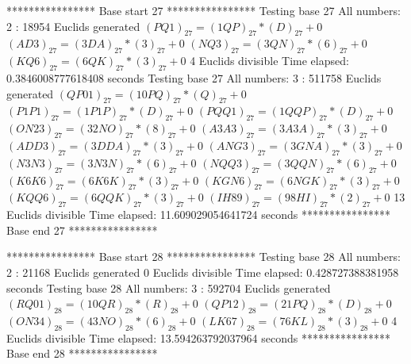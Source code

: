 **************** Base start 27 ****************
Testing base 27 All numbers: 2 :
	 18954 Euclids generated
	$(PQ1)_{27}=(1QP)_{27}*(D)_{27}+0$
	$(AD3)_{27}=(3DA)_{27}*(3)_{27}+0$
	$(NQ3)_{27}=(3QN)_{27}*(6)_{27}+0$
	$(KQ6)_{27}=(6QK)_{27}*(3)_{27}+0$
	 4 Euclids divisible
Time elapsed: 0.3846008777618408 seconds
Testing base 27 All numbers: 3 :
	 511758 Euclids generated
	$(QP01)_{27}=(10PQ)_{27}*(Q)_{27}+0$
	$(P1P1)_{27}=(1P1P)_{27}*(D)_{27}+0$
	$(PQQ1)_{27}=(1QQP)_{27}*(D)_{27}+0$
	$(ON23)_{27}=(32NO)_{27}*(8)_{27}+0$
	$(A3A3)_{27}=(3A3A)_{27}*(3)_{27}+0$
	$(ADD3)_{27}=(3DDA)_{27}*(3)_{27}+0$
	$(ANG3)_{27}=(3GNA)_{27}*(3)_{27}+0$
	$(N3N3)_{27}=(3N3N)_{27}*(6)_{27}+0$
	$(NQQ3)_{27}=(3QQN)_{27}*(6)_{27}+0$
	$(K6K6)_{27}=(6K6K)_{27}*(3)_{27}+0$
	$(KGN6)_{27}=(6NGK)_{27}*(3)_{27}+0$
	$(KQQ6)_{27}=(6QQK)_{27}*(3)_{27}+0$
	$(IH89)_{27}=(98HI)_{27}*(2)_{27}+0$
	 13 Euclids divisible
Time elapsed: 11.609029054641724 seconds
**************** Base end 27 ****************

**************** Base start 28 ****************
Testing base 28 All numbers: 2 :
	 21168 Euclids generated
	 0 Euclids divisible
Time elapsed: 0.428727388381958 seconds
Testing base 28 All numbers: 3 :
	 592704 Euclids generated
	$(RQ01)_{28}=(10QR)_{28}*(R)_{28}+0$
	$(QP12)_{28}=(21PQ)_{28}*(D)_{28}+0$
	$(ON34)_{28}=(43NO)_{28}*(6)_{28}+0$
	$(LK67)_{28}=(76KL)_{28}*(3)_{28}+0$
	 4 Euclids divisible
Time elapsed: 13.594263792037964 seconds
**************** Base end 28 ****************

